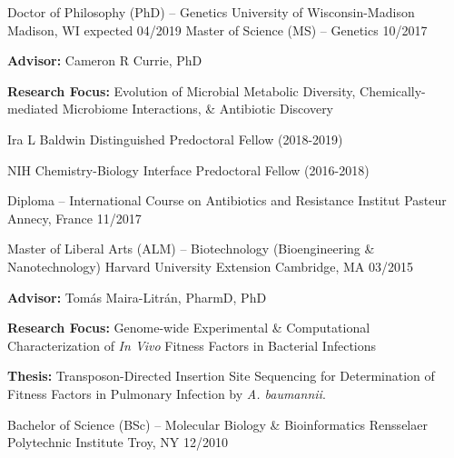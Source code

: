 {}

\begin{cventries}
\cventry
	{Doctor of Philosophy (PhD) -- Genetics}
	{University of Wisconsin-Madison}
	{Madison, WI}
	{expected 04/2019}
	{}
	\vspace{-0.4cm}
\cventry
	{Master of Science (MS) -- Genetics}
	{}
	{}
	{10/2017}
	{
      \begin{cvitems}
      	\item {\textbf{Advisor:} Cameron R Currie, PhD}
      	\item {\textbf{Research Focus:} Evolution of Microbial Metabolic Diversity, Chemically-mediated Microbiome Interactions, \& Antibiotic Discovery}
      	\item {Ira L Baldwin Distinguished Predoctoral Fellow (2018-2019)}
      	\item {NIH Chemistry-Biology Interface Predoctoral Fellow (2016-2018)}
      \end{cvitems}
    }
    
\cventry
	{Diploma -- International Course on Antibiotics and Resistance}
	{Institut Pasteur}
	{Annecy, France}
	{11/2017}
	{} \vspace{-4mm}
    
\cventry
	{Master of Liberal Arts (ALM) -- Biotechnology (Bioengineering \& Nanotechnology)}
	{Harvard University Extension}
	{Cambridge, MA}
	{03/2015}
	{
      \begin{cvitems}
      	\item {\textbf{Advisor:} Tom\'{a}s Maira-Litr\'{a}n, PharmD, PhD}
      	\item {\textbf{Research Focus:} Genome-wide Experimental \& Computational Characterization of \textit{In Vivo} Fitness Factors in Bacterial Infections}
      	\item {\textbf{Thesis:} Transposon-Directed Insertion Site Sequencing for Determination of Fitness Factors in Pulmonary Infection by \textit{A. baumannii}.}
      \end{cvitems}
    }

\cventry
	{Bachelor of Science (BSc) -- Molecular Biology \& Bioinformatics}
	{Rensselaer Polytechnic Institute}
	{Troy, NY}
	{12/2010}
	{}
\end{cventries}

\vspace{-7mm}